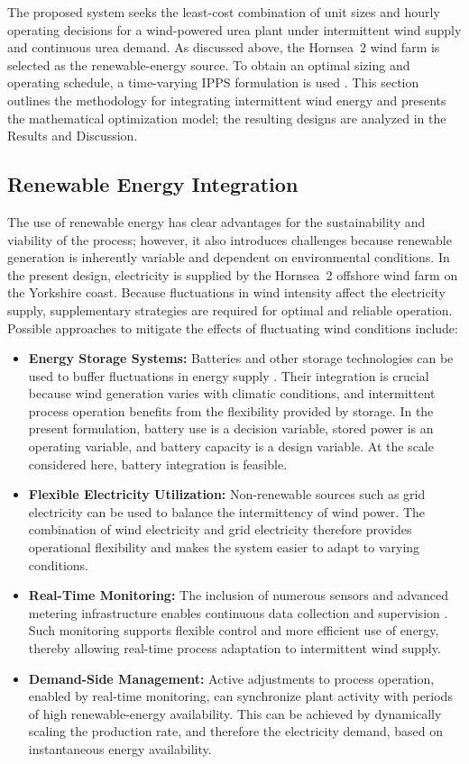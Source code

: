 \documentclass[letterpaper]{article}
\begin{document}
The proposed system seeks the least-cost combination of unit sizes
and hourly operating decisions for a wind-powered urea plant under
intermittent wind supply and continuous urea demand. As discussed
above, the Hornsea~2 wind farm is selected as the renewable-energy
source. To obtain an optimal sizing and operating schedule, a
time-varying IPPS formulation is used \cite{Zhang2017IPPS}. This
section outlines the methodology for integrating intermittent wind
energy and presents the mathematical optimization model; the
resulting designs are analyzed in the Results and Discussion.

\subsection{Renewable Energy Integration}
The use of renewable energy has clear advantages for the
sustainability and viability of the process; however, it also
introduces challenges because renewable generation is inherently
variable and dependent on environmental conditions. In the present
design, electricity is supplied by the Hornsea~2 offshore wind farm
on the Yorkshire coast. Because fluctuations in wind intensity affect
the electricity supply, supplementary strategies are required for
optimal and reliable operation. Possible approaches to mitigate the
effects of fluctuating wind conditions include:
\begin{itemize}
  \item \textbf{Energy Storage Systems:} Batteries and other storage
    technologies can be used to buffer fluctuations in energy supply
    \cite{Rashid2016}. Their integration is crucial because wind
    generation varies with climatic conditions, and intermittent
    process operation benefits from the flexibility provided by
    storage. In the present formulation, battery use is a decision
    variable, stored power is an operating variable, and battery
    capacity is a design variable. At the scale considered here,
    battery integration is feasible.
  \item \textbf{Flexible Electricity Utilization:} Non-renewable
    sources such as grid electricity can be used to balance the
    intermittency of wind power. The combination of wind electricity
    and grid electricity therefore provides operational flexibility
    and makes the system easier to adapt to varying conditions.
  \item \textbf{Real-Time Monitoring:} The inclusion of numerous
    sensors and advanced metering infrastructure enables continuous
    data collection and supervision \cite{GaoSheng2018}. Such
    monitoring supports flexible control and more efficient use of
    energy, thereby allowing real-time process adaptation to
    intermittent wind supply.
  \item \textbf{Demand-Side Management:} Active adjustments to
    process operation, enabled by real-time monitoring, can
    synchronize plant activity with periods of high renewable-energy
    availability. This can be achieved by dynamically scaling the
    production rate, and therefore the electricity demand, based on
    instantaneous energy availability.
\end{itemize}
\end{document}
